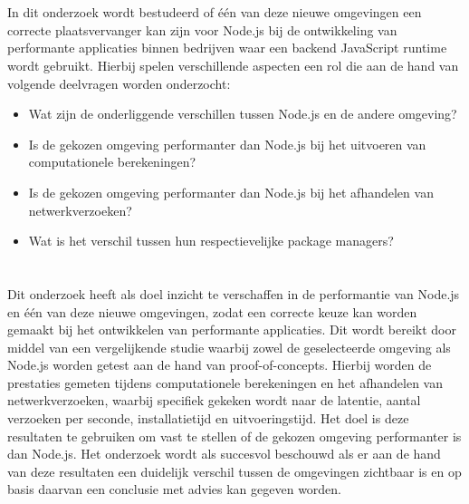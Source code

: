 \section{}%
\label{sec:onderzoeksvraag}

In dit onderzoek wordt bestudeerd of één van deze nieuwe omgevingen
een correcte plaatsvervanger kan zijn voor Node.js bij de ontwikkeling van performante applicaties binnen bedrijven 
waar een backend JavaScript runtime wordt gebruikt.
Hierbij spelen verschillende aspecten een rol die aan de hand van volgende deelvragen worden onderzocht:
\begin{itemize}
  \item Wat zijn de onderliggende verschillen tussen Node.js en de andere omgeving?
  \item Is de gekozen omgeving performanter dan Node.js bij het uitvoeren van computationele berekeningen?
  \item Is de gekozen omgeving performanter dan Node.js bij het afhandelen van netwerkverzoeken?
  \item Wat is het verschil tussen hun respectievelijke package managers?
\end{itemize}

\section{}%
\label{sec:onderzoeksdoelstelling}

Dit onderzoek heeft als doel inzicht te verschaffen in de performantie van Node.js en één van deze nieuwe omgevingen,
zodat een correcte keuze kan worden gemaakt bij het ontwikkelen van performante applicaties. Dit wordt bereikt door middel van een vergelijkende studie
waarbij zowel de geselecteerde omgeving als Node.js worden getest aan de hand van proof-of-concepts. 
Hierbij worden de prestaties gemeten tijdens computationele berekeningen en het afhandelen van netwerkverzoeken, waarbij specifiek gekeken wordt naar
de latentie, aantal verzoeken per seconde, installatietijd en uitvoeringstijd. 
Het doel is deze resultaten te gebruiken om vast te stellen of de gekozen omgeving performanter is dan Node.js. 
Het onderzoek wordt als succesvol beschouwd als er aan de hand van deze resultaten een duidelijk verschil tussen de omgevingen zichtbaar is 
en op basis daarvan een conclusie met advies kan gegeven worden.
\section{}%
\label{sec:opzet-bachelorproef}

